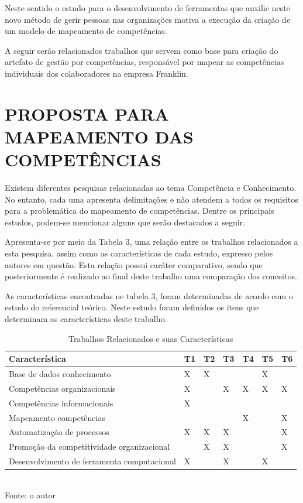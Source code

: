 Neste sentido o estudo para o desenvolvimento de ferramentas que auxilie neste novo método de gerir pessoas nas organizações motiva a execução da criação de um modelo de mapeamento de competências.

A seguir serão relacionados trabalhos que servem como base para criação do artefato de gestão por competências, responsável por mapear as competências individuais dos colaboradores na empresa Franklin.

\chapter{PROPOSTA PARA MAPEAMENTO DAS COMPETÊNCIAS} \label{sec:capitulos}

Existem diferentes pesquisas relacionadas ao tema Competência e Conhecimento. No entanto, cada uma apresenta delimitações e não atendem a todos os requisitos para a problemática do mapeamento de competências. Dentre os principais estudos, podem-se mencionar alguns que serão destacados a seguir.

Apresenta-se por meio da Tabela 3, uma relação entre os trabalhos relacionados a esta pesquisa, assim como as características de cada estudo, expresso pelos autores em questão. Esta relação possui caráter comparativo, sendo que posteriormente é realizado ao final deste trabalho uma comparação dos conceitos.

As características encontradas ne tabela 3, foram determinadas de acordo com o estudo do referencial teórico. Neste estudo foram definidos os itens que determinam as características deste trabalho.

\begin{table}[htbp]
	\centering
	\caption{Trabalhos Relacionados e suas Características}
	\label{tab:trabalhos_relacionados}
	\begin{tabular}{l|l|l|l|l|l|l} \hline
		\textbf{Característica} & \textbf{T1} & \textbf{T2} & \textbf{T3} & \textbf{T4} & \textbf{T5} & \textbf{T6} \\
		\hline
		Base de dados conhecimento & X  & X &  &  & X & \\
		\hline
		Competências organizacionais & X &  & X & X & X & X\\
		\hline
		Competências informacionais& X &  &  &  &  & \\
		\hline
		Mapeamento competências &  &  &  & X &  & X \\
		\hline
		Automatização de processos & X & X & X &  &  & X\\
		\hline
		Promoção da competitividade organizacional &  & X & X &  &  &  	X	    \\
		\hline
		Desenvolvimento de ferramenta computacional&X&&X&&X&\\

		\hline
	\end{tabular}
	\vspace{2mm}
	\\ \footnotesize Fonte: o autor
\end{table}


